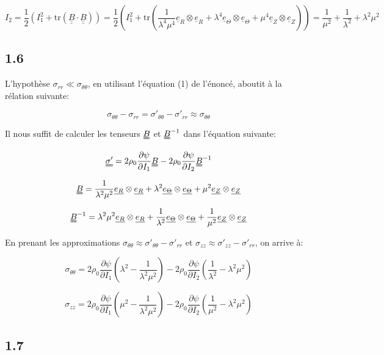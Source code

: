 \documentclass[a4paper,11pt]{article}
\newcommand{\tens}{\uuline}
\newcommand{\diage}[1]{\uline{e_{#1}} \otimes \uline{e_{#1}}}
\begin{document}
	$$I_2 = \frac{1}{2}\left(I_1^2+\text{tr}\left(\underline{\underline{B}}\cdot\underline{\underline{B}}\right)\right) = \frac{1}{2}\left(I_1^2+\text{tr}\left( \frac{1}{\lambda^4\mu^4}\underline{e}_R\otimes\underline{e}_R + \lambda^4\underline{e}_\Theta\otimes\underline{e}_\Theta + \mu^4\underline{e}_Z\otimes\underline{e}_Z \right)\right)  = \frac{1}{\mu^2}+\frac{1}{\lambda^2}+\lambda^2\mu^2$$



\subsection*{1.6}

L'hypothèse $\sigma_{rr} \ll \sigma_{\theta\theta}$, en utilisant l'équation (1) de l'énoncé, aboutit à la rélation suivante:

$$\sigma_{\theta\theta} - \sigma_{rr} = \sigma'_{\theta\theta} - \sigma'_{rr} \approx \sigma_{\theta\theta}$$

Il nous suffit de calculer les tenseurs $\tens{B}$ et $\tens{B}^{-1}$ dans l'équation suivante:

$$ \tens{\sigma'} = 2 \rho_0 \frac{\partial\psi}{\partial I_1} \tens {B} - 2 \rho_0 \frac{\partial\psi}{\partial I_2} \tens {B}^{-1}$$

$$ \tens{B} = \frac{1}{\lambda^2\mu^2} \diage{R} + \lambda^2 \diage{\Theta} + \mu^2 \diage{Z} $$

$$ \tens{B}^{-1} = \lambda^2\mu^2 \diage{R} + \frac{1}{\lambda^2} \diage{\Theta} + \frac{1}{\mu^2} \diage{Z} $$

En prenant les approximations $\sigma_{\theta\theta} \approx \sigma'_{\theta\theta} - \sigma'_{rr}$ et $\sigma_{zz} \approx \sigma'_{zz} - \sigma'_{rr}$, on arrive à:

$$\sigma_{\theta\theta} = 2 \rho_0 \frac{\partial\psi}{\partial I_1} \left( \lambda^2 - \frac{1}{\lambda^2\mu^2} \right) - 2 \rho_0 \frac{\partial\psi}{\partial I_2} \left( \frac{1}{\lambda^2} - \lambda^2\mu^2 \right)$$

$$\sigma_{zz} = 2 \rho_0 \frac{\partial\psi}{\partial I_1} \left( \mu^2 - \frac{1}{\lambda^2\mu^2} \right) - 2 \rho_0 \frac{\partial\psi}{\partial I_2} \left( \frac{1}{\mu^2} - \lambda^2\mu^2 \right)$$

\subsection*{1.7}
\end{document}
